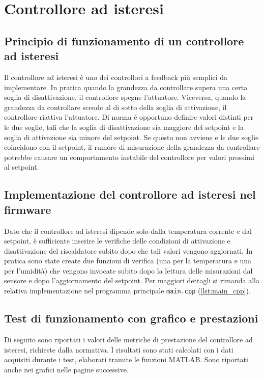\newpage

\section{Controllore ad isteresi}
\subsection{Principio di funzionamento di un controllore ad isteresi}
Il controllore ad isteresi è uno dei controllori a feedback più semplici da implementare. In pratica quando la grandezza
da controllare supera una certa soglia di disattivazione, il controllore spegne l'attuatore. Viceversa, quando la grandezza
da controllare scende al di sotto della soglia di attivazione, il controllore riattiva l'attuatore. Di norma è opportuno definire
valori distinti per le due soglie, tali che la soglia di disattivazione sia maggiore del setpoint e la soglia di attivazione
sia minore del setpoint. Se questo non avviene e le due soglie coincidono con il setpoint, il rumore di misurazione della
grandezza da controllare potrebbe causare un comportamento instabile del controllore per valori prossimi al setpoint.

\subsection{Implementazione del controllore ad isteresi nel firmware}
Dato che il controllore ad isteresi dipende solo dalla temperatura corrente e dal setpoint, è sufficiente inserire le
verifiche delle condizioni di attivazione e disattivazione del riscaldatore subito dopo che tali valori vengono aggiornati.
In pratica sono state create due funzioni di verifica (una per la temperatura e una per l'umidità) che vengono invocate subito
dopo la lettura delle misurazioni dal sensore e dopo l'aggiornamento del setpoint. Per maggiori dettagli si rimanda alla
relativa implementazione nel programma principale \verb|main.cpp| (\autoref{lst:main_cpp}).

\subsection{Test di funzionamento con grafico e prestazioni}
Di seguito sono riportati i valori delle metriche di prestazione del controllore ad isteresi, richieste dalla normativa.
I risultati sono stati calcolati con i dati acquisiti durante i test, elaborati tramite le funzioni MATLAB. Sono riportati
anche nei grafici nelle pagine successive.

